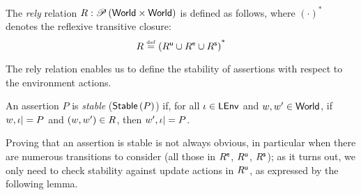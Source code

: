\begin{definition}[Rely]
The \emph{rely} relation $R: \mathscr{P}\left(\textsf{World} \times \textsf{World} \right)$ is defined as follows, where $(\cdot)^{\text{*}}$ denotes the reflexive transitive closure:
%
\[
  R \mathrel{\stackrel{\smash{\scriptscriptstyle{\mathrm{def}}}}{=}}  \left(R^{\textsf{u}} \cup R^{\textsf{e}} \cup R^{\textsf{s}} \right)^{\text{*}}
\]
%
\end{definition}

The rely relation enables us to define the stability of assertions with respect to the environment actions.
%
\begin{definition}[Stability]
An assertion $P$ is \emph{stable} ($\textsf{Stable}\left(P\right)$) if, for all $\iota \in \textsf{LEnv}$ and $w, w' \in \textsf{World}$, if $w, \iota |= P$ and $(w, w') \in R$, then $w', \iota |= P$.
\end{definition}
%
Proving that an assertion is stable is not always obvious, in particular when there are numerous transitions to consider (all those in $R^{\textsf{e}}$, $R^{\textsf{u}}$, $R^{\textsf{s}}$); as it turns out, we only need to check stability against update actions in $R^{\textsf{u}}$, as expressed by the following lemma.
%
